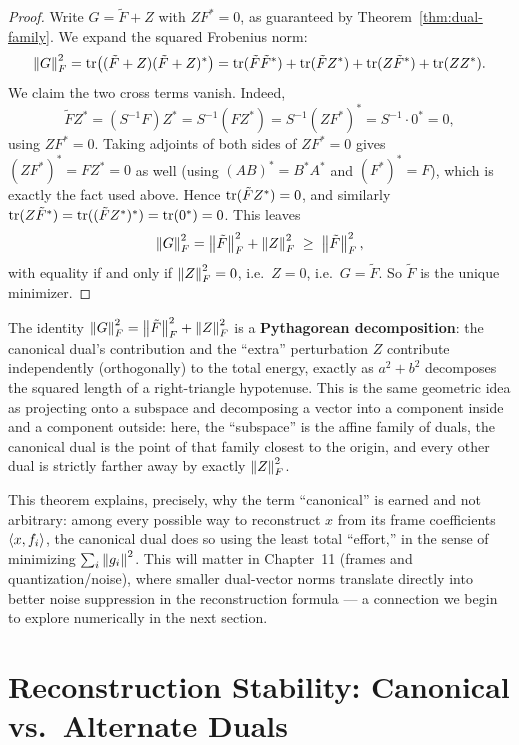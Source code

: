 \begin{proof}
Write $G = \tilde F + Z$ with $ZF^*=0$, as guaranteed by
Theorem~\ref{thm:dual-family}. We expand the squared Frobenius norm:
\[
  \left\| G \right\|_F^2 = \operatorname{tr}\bigl((\tilde F+Z)(\tilde F+Z)^*\bigr)
  = \operatorname{tr}(\tilde F\tilde F^*) + \operatorname{tr}(\tilde FZ^*) + \operatorname{tr}(Z\tilde F^*) + \operatorname{tr}(ZZ^*).
\]
We claim the two cross terms vanish. Indeed,
\[
  \tilde F Z^* = (S^{-1}F)Z^* = S^{-1}(FZ^*) = S^{-1}(ZF^*)^* = S^{-1}\cdot0^* = 0,
\]
using $ZF^*=0$. Taking adjoints of both sides of $ZF^*=0$ gives
$(ZF^*)^*=FZ^*=0$ as well (using $(AB)^*=B^*A^*$ and $(F^*)^*=F$), which
is exactly the fact used above. Hence $\operatorname{tr}(\tilde FZ^*)=0$, and
similarly $\operatorname{tr}(Z\tilde F^*)=\operatorname{tr}((\tilde FZ^*)^*)=\operatorname{tr}(0^*)=0$. This leaves
\[
  \left\| G \right\|_F^2 = \left\| \tilde F \right\|_F^2 + \left\| Z \right\|_F^2 \;\ge\; \left\| \tilde F \right\|_F^2,
\]
with equality if and only if $\left\| Z \right\|_F^2=0$, i.e.\ $Z=0$, i.e.\
$G=\tilde F$. So $\tilde F$ is the unique minimizer.
\end{proof}

\begin{keyidea}
The identity $\left\| G \right\|_F^2 = \left\| \tilde F \right\|_F^2+\left\| Z \right\|_F^2$ is a
\textbf{Pythagorean decomposition}: the canonical dual's contribution
and the ``extra'' perturbation $Z$ contribute independently
(orthogonally) to the total energy, exactly as $a^2+b^2$ decomposes the
squared length of a right-triangle hypotenuse. This is the same
geometric idea as projecting onto a subspace and decomposing a vector
into a component inside and a component outside: here, the
``subspace'' is the affine family of duals, the canonical dual is the
point of that family closest to the origin, and every other dual is
strictly farther away by exactly $\left\| Z \right\|_F^2$.
\end{keyidea}

\begin{remark*}
This theorem explains, precisely, why the term ``canonical'' is earned
and not arbitrary: among every possible way to reconstruct $x$ from its
frame coefficients $\left\langle x, f_i \right\rangle$, the canonical dual does so using
the least total ``effort,'' in the sense of minimizing $\sum_i\left\| g_i \right\|^2$.
This will matter in Chapter~11 (frames and quantization/noise), where
smaller dual-vector norms translate directly into better noise
suppression in the reconstruction formula --- a connection we begin to
explore numerically in the next section.
\end{remark*}

\section{Reconstruction Stability: Canonical vs.\ Alternate Duals}
\label{sec:stability}

